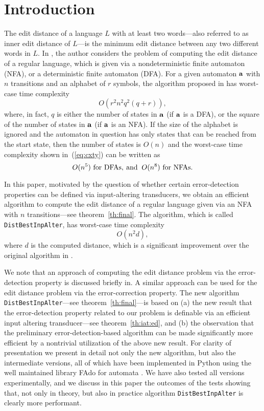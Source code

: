 \documentclass{article}
\theoremstyle{plain}
\theoremstyle{definition}
\theoremstyle{remark}
\begin{document}
\section{Introduction}\label{sec:intro}
The edit distance of a language $L$ with at least two
words---also referred to as
inner edit distance of $L$---is the minimum edit distance
between any two different words in $L$.
In \cite{Kon:2007}, the author considers the problem of
computing the edit distance of a regular language, which
is given via a nondeterministic finite automaton (NFA),
or a deterministic finite automaton (DFA).
For a given automaton $\mathbf{a}$ with
$n$ transitions and an alphabet of $r$ symbols, the algorithm proposed in \cite{Kon:2007} has
worst-case time complexity
\begin{equation}\label{eq:cxty}
O(r^2n^2q^2(q+r)),
\end{equation}
where, in fact, $q$ is either the number of states in $\mathbf{a}$ (if $\mathbf{a}$ is a DFA), or the square of the number of states in
$\mathbf{a}$ (if $\mathbf{a}$ is an NFA).
If the size of the alphabet is ignored and the automaton in question has only states that can be reached from the start state, then the number of states
is $O(n)$ and the worst-case time complexity shown in~(\ref{eq:cxty})
can be written as
\begin{equation}\label{eq:cxty2}
O(n^5) \hbox{ for DFAs},\> \hbox {and }\> O(n^8) \hbox{ for NFAs}.
\end{equation}
\par
In this paper, motivated by the question of whether certain
error-detection properties can be defined via input-altering
transducers, we obtain an efficient algorithm to compute the
edit distance of a regular language given via an NFA with
$n$ transitions---see theorem~\ref{th:final}. The
algorithm, which is called \texttt{DistBestInpAlter}, has worst-case time complexity
\begin{equation}\label{eq:cxty3}
O(n^2d),
\end{equation}
where $d$ is the computed distance, which is a significant improvement over the original algorithm in \cite{Kon:2007}.

We note that an approach of computing the edit distance
problem via the error-detection property is
discussed briefly in\cite{KonSil:2010}. A similar approach
can be used for the edit distance problem via the
error-correction property.
The new algorithm \texttt{DistBestInpAlter}---see theorem~\ref{th:final}---is based on
(a) the new result that the error-detection property related to our problem is definable via an efficient input altering transducer---see theorem~\ref{th:iat:ed}, and (b) the
observation that the preliminary error-detection-based algorithm can be made significantly more efficient by
a nontrivial utilization of the above new result.
For clarity
of presentation we present in detail not only the
new algorithm, but also
the intermediate versions, all of which
have been implemented  in Python using the well maintained library
FAdo for automata \cite{Fado}.
We have also tested all versions experimentally,
and we discuss in this paper the outcomes of the tests showing that, not only in theory, but also in practice algorithm \texttt{DistBestInpAlter} is clearly more performant.
\end{document}
